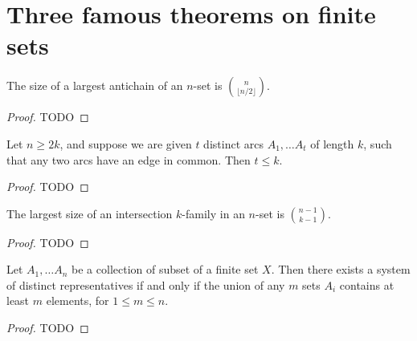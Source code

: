 \chapter{Three famous theorems on finite sets}
\label{chapter30}

\begin{theorem}
  \label{ch30theorem1}
  The size of a largest antichain of an $n$-set is $\binom{n}{\lfloor n/2\rfloor}$.
\end{theorem}
\begin{proof}
  TODO
\end{proof}

\begin{lemma}
  \label{ch30lemma}
  Let $n \ge 2k$, and suppose we are given $t$ distinct arcs $A_1, \dots A_t$
  of length $k$, such that any two arcs have an edge in common. Then $t \le k$.
\end{lemma}
\begin{proof}
  TODO
\end{proof}

\begin{theorem}
  \label{ch30theorem2}
  The largest size of an intersection $k$-family in an $n$-set is $\binom{n - 1}{k - 1}$.
\end{theorem}
\begin{proof}
  TODO
\end{proof}

\begin{theorem}
  \label{ch30theorem3}
  Let  $A_1, \dots A_n$ be a collection of subset of a finite set $X$.
  Then there exists a system of distinct representatives if and only if the union of any $m$
  sets $A_i$ contains at least $m$ elements, for $1 \le m \le n$.
\end{theorem}
\begin{proof}
  TODO
\end{proof}

